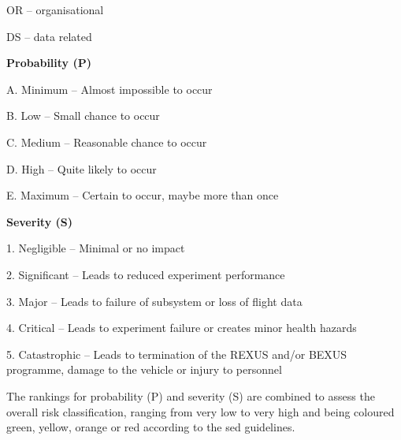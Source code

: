 \documentclass[
  a4paper,
  11pt,
  openany,
  parskip,
  toc=totoc,
  listof=totoc,
  bibliography=totoc
]{scrreprt}
\begin{document}
OR -- organisational

DS -- data related

\textbf{Probability (P)}

A. Minimum -- Almost impossible to occur

B. Low -- Small chance to occur

C. Medium -- Reasonable chance to occur

D. High -- Quite likely to occur

E. Maximum -- Certain to occur, maybe more than once

\textbf{Severity (S)}

1. Negligible -- Minimal or no impact

2. Significant -- Leads to reduced experiment performance

3. Major -- Leads to failure of subsystem or loss of flight data

4. Critical -- Leads to experiment failure or creates minor health hazards

5. Catastrophic -- Leads to termination of the REXUS and/or BEXUS programme, damage to the vehicle or injury to personnel

The rankings for probability (P) and severity (S) are combined to assess the overall risk classification, ranging from very low to very high and being coloured green, yellow, orange or red according to the \gls{sed} guidelines.
\end{document}
